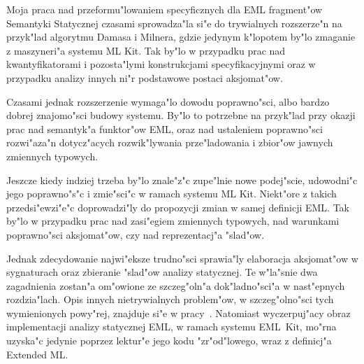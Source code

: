 Moja praca nad przeformu"lowaniem specyficznych dla EML
fragment"ow Semantyki Statycznej czasami sprowadza"la si"e 
do trywialnych rozszerze"n na przyk"lad algorytmu Damasa i Milnera,
gdzie jedynym k"lopotem by"lo zmaganie z maszyneri"a systemu ML Kit. 
Tak by"lo w przypadku prac nad kwantyfikatorami i pozosta"lymi konstrukcjami specyfikacyjnymi
oraz w przypadku analizy innych ni"r podstawowe postaci aksjomat"ow.

Czasami jednak rozszerzenie wymaga"lo dowodu poprawno"sci,
albo bardzo dobrej znajomo"sci budowy systemu.
By"lo to potrzebne na przyk"lad przy okazji prac nad semantyk"a funktor"ow EML,
oraz nad ustaleniem poprawno"sci rozwi"aza"n dotycz"acych 
rozwik"lywania prze"ladowania i zbior"ow jawnych zmiennych typowych.

Jeszcze kiedy indziej trzeba by"lo znale"z"c zupe"lnie nowe podej"scie,
udowodni"c jego poprawno"s"c i zmie"sci"c w ramach systemu ML Kit.
Niekt"ore z takich przedsi"ewzi"e"c doprowadzi"ly do propozycji zmian w samej definicji EML.
Tak by"lo w przypadku prac nad zasi"egiem zmiennych typowych, 
nad warunkami poprawno"sci aksjomat"ow, czy nad reprezentacj"a "slad"ow.

Jednak zdecydowanie najwi"eksze trudno"sci sprawia"ly
elaboracja aksjomat"ow w sygnaturach oraz zbieranie "slad"ow analizy statycznej.
Te w"la"snie dwa zagadnienia zostan"a om"owione 
ze szcze\-g"ol\-n"a dok"ladno"sci"a w nast"epnych rozdzia"lach.
Opis innych nietrywialnych problem"ow, 
w szczeg"olno"sci tych wymienionych powy"rej, znajduje si"e w pracy~\cite{JKS96}.
Natomiast wyczerpuj"acy obraz implementacji analizy statycznej EML, w ramach systemu EML~Kit, 
mo"rna uzyska"c jedynie poprzez lektur"e jego kodu "zr"od"lowego, wraz z definicj"a Extended ML.


